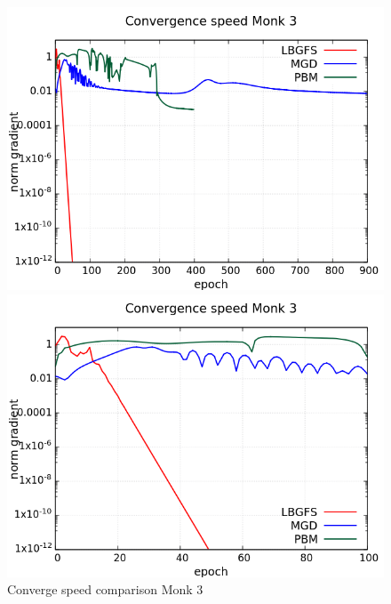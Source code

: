 \begin{figure}[H]
	\centering
	\begin{minipage}[t]{0.5\linewidth}
		\includegraphics[width=\linewidth]{data/Comparison/Monk3/Monk3_CS_Comparison_log_standard.png}
	\end{minipage}%
	\begin{minipage}[t]{0.5\linewidth}
		\includegraphics[width=\linewidth]{data/Comparison/Monk3/Monk3_CS_Comparison_log_zoom.png}
	\end{minipage}
	\caption{Converge speed comparison Monk 3}
	\label{CS-Monk3}
\end{figure}

